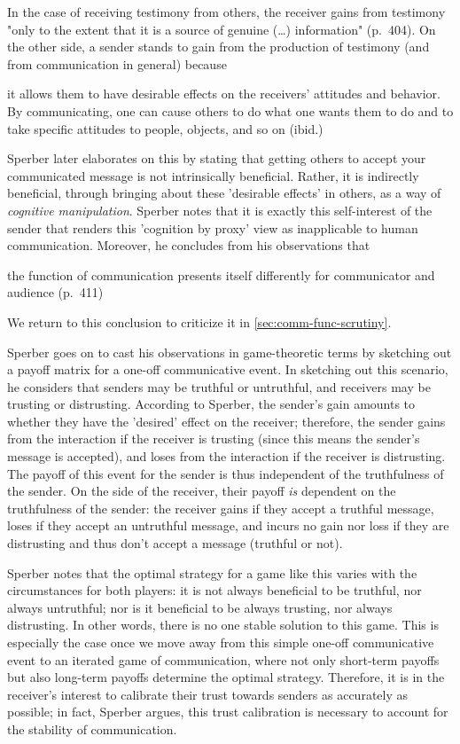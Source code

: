 In the case of receiving testimony from others, the receiver gains from testimony "only to the extent that it is a source of genuine (\ldots) information" (p.~404).
On the other side, a sender stands to gain from the production of testimony (and from communication in general) because
\begin{quoting}
    it allows them to have desirable effects on the receivers' attitudes and behavior. By communicating, one can cause others to do what one wants them to do and to take specific attitudes to people, objects, and so on
    \hfill (ibid.)
\end{quoting}
Sperber later elaborates on this by stating that getting others to accept your communicated message is not intrinsically beneficial. Rather, it is indirectly beneficial, through bringing about these 'desirable effects' in others, as a way of \emph{cognitive manipulation}.
Sperber notes that it is exactly this self-interest of the sender that renders this 'cognition by proxy' view as inapplicable to human communication.
Moreover, he concludes from his observations that
\begin{quoting}
    the function of communication presents itself differently for communicator and audience
    \hfill (p.~411)
\end{quoting}
We return to this conclusion to criticize it in \cref{sec:comm-func-scrutiny}.

Sperber goes on to cast his observations in game-theoretic terms by sketching out a payoff matrix for a one-off communicative event. In sketching out this scenario, he considers that senders may be truthful or untruthful, and receivers may be trusting or distrusting. According to Sperber, the sender's gain amounts to whether they have the 'desired' effect on the receiver; therefore, the sender gains from the interaction if the receiver is trusting (since this means the sender's message is accepted), and loses from the interaction if the receiver is distrusting. The payoff of this event for the sender is thus independent of the truthfulness of the sender. On the side of the receiver, their payoff \emph{is} dependent on the truthfulness of the sender: the receiver gains if they accept a truthful message, loses if they accept an untruthful message, and incurs no gain nor loss if they are distrusting and thus don't accept a message (truthful or not).

Sperber notes that the optimal strategy for a game like this varies with the circumstances for both players: it is not always beneficial to be truthful, nor always untruthful; nor is it beneficial to be always trusting, nor always distrusting. In other words, there is no one stable solution to this game.
This is especially the case once we move away from this simple one-off communicative event to an iterated game of communication, where not only short-term payoffs but also long-term payoffs determine the optimal strategy.
Therefore, it is in the receiver's interest to calibrate their trust towards senders as accurately as possible; in fact, Sperber argues, this trust calibration is necessary to account for the stability of communication.

